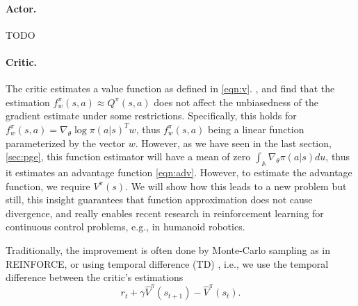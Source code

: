 \paragraph{Actor.} TODO

\paragraph{Critic.} The critic estimates a value function as defined in \eqref{eqn:v}. \cite{Sutton:1999:PGM:3009657.3009806}, and \cite{Konda:2003:AA:942271.942292} find that the estimation $f_w^\pi(s,a) \approx Q^\pi(s,a)$ does not affect the unbiasedness of the gradient estimate under some restrictions. Specifically, this holds for $f_w^\pi(s,a) = {\nabla_\theta \log\pi(a|s)}^T w$, thus $f_w^\pi(s,a)$ being a linear function parameterized by the vector $w$. However, as we have seen in the last section, \ref{sec:pge}, this function estimator will have a mean of zero $\int_\mathbb{A} \nabla_\theta \pi(a|s)du $, thus it estimates an advantage function \ref{eqn:adv}. However, to estimate the advantage function, we require $V^\pi(s)$. We will show how this leads to a new problem but still, this insight guarantees that function approximation does not cause divergence, and really enables recent research in reinforcement learning for continuous control problems, e.g., in humanoid robotics.

Traditionally, the improvement is often done by Monte-Carlo sampling as in REINFORCE, or using temporal difference (TD) \cite{Sutton1988}, i.e., we use the temporal difference between the critic's estimations 
\begin{equation}
  r_t + \gamma \hat{V}^\pi(s_{t+1}) - \hat{V}^\pi(s_t).
\end{equation}

